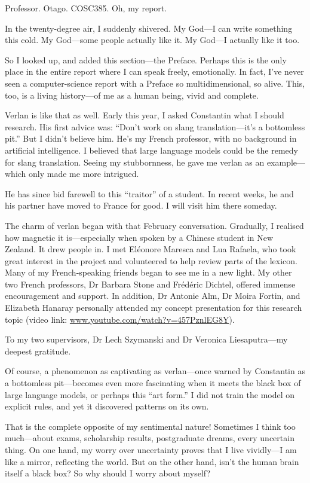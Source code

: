\documentclass[12pt]{article}
\begin{document}
Professor. Otago. COSC385. Oh, my report.

In the twenty-degree air, I suddenly shivered. My God\;---\;I can write something this cold.
My God\;---\;some people actually like it.
My God\;---\;I actually like it too.

So I looked up, and added this section\;---\;the Preface.
Perhaps this is the only place in the entire report where I can speak freely, emotionally.
In fact, I've never seen a computer-science report with a Preface so multidimensional, so alive. This, too, is a living history\;---\;of me as a human being, vivid and complete.

Verlan is like that as well. Early this year, I asked Constantin what I should research. His first advice was: ``Don't work on slang translation\;---\;it's a bottomless pit.'' But I didn't believe him. He's my French professor, with no background in artificial intelligence. I believed that large language models could be the remedy for slang translation. Seeing my stubbornness, he gave me verlan as an example\;---\;which only made me more intrigued.

He has since bid farewell to this ``traitor'' of a student. In recent weeks, he and his partner have moved to France for good. I will visit him there someday.

The charm of verlan began with that February conversation. Gradually, I realised how magnetic it is\;---\;especially when spoken by a Chinese student in New Zealand. It drew people in. I met Eléonore Maresca and Lua Rafaela, who took great interest in the project and volunteered to help review parts of the lexicon. Many of my French-speaking friends began to see me in a new light. My other two French professors, Dr Barbara Stone and Frédéric Dichtel, offered immense encouragement and support. In addition, Dr Antonie Alm, Dr Moira Fortin, and Elizabeth Hanaray personally attended my concept presentation for this research topic (video link: \url{www.youtube.com/watch?v=457PznlEG8Y}).

To my two supervisors, Dr Lech Szymanski and Dr Veronica Liesaputra\;---\;my deepest gratitude.

Of course, a phenomenon as captivating as verlan\;---\;once warned by Constantin as a bottomless pit\;---\;becomes even more fascinating when it meets the black box of large language models, or perhaps this ``art form.'' I did not train the model on explicit rules, and yet it discovered patterns on its own.

That is the complete opposite of my sentimental nature!
Sometimes I think too much\;---\;about exams, scholarship results, postgraduate dreams, every uncertain thing. On one hand, my worry over uncertainty proves that I live vividly\;---\;I am like a mirror, reflecting the world. But on the other hand, isn't the human brain itself a black box?
So why should I worry about myself?
\end{document}
